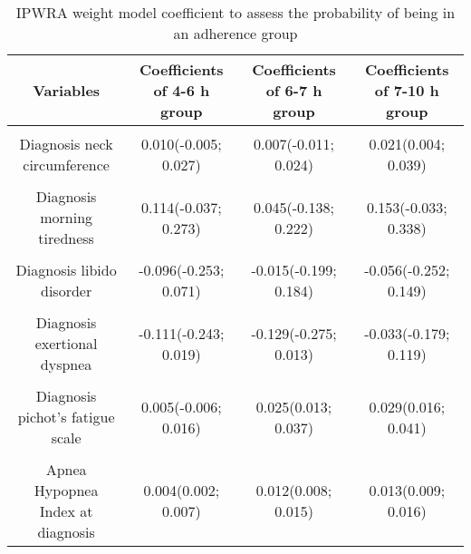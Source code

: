 \documentclass{article}
\begin{document}
\begin{table}[H]

\caption{\label{tab:Wheight_coefficients}IPWRA weight model coefficient to assess the probability of being in an adherence group}
\centering
\fontsize{7}{9}\selectfont
\begin{tabular}[t]{cccc}
\toprule
Variables & Coefficients of 4-6 h group & Coefficients of 6-7 h group & Coefficients of 7-10 h group\\
\midrule
\cellcolor{gray!6}{Diagnosis age (years)} & \cellcolor{gray!6}{0.013(0.008; 0.018)} & \cellcolor{gray!6}{0.022(0.016; 0.028)} & \cellcolor{gray!6}{0.030(0.024; 0.037)}\\
Diagnosis neck circumference & 0.010(-0.005; 0.027) & 0.007(-0.011; 0.024) & 0.021(0.004; 0.039)\\
\cellcolor{gray!6}{Diagnosis sleepiness at the wheel} & \cellcolor{gray!6}{0.205(0.084; 0.338)} & \cellcolor{gray!6}{0.197(0.047; 0.348)} & \cellcolor{gray!6}{0.060(-0.088; 0.213)}\\
Diagnosis morning tiredness & 0.114(-0.037; 0.273) & 0.045(-0.138; 0.222) & 0.153(-0.033; 0.338)\\
\cellcolor{gray!6}{Diagnosis morning headaches} & \cellcolor{gray!6}{0.012(-0.126; 0.153)} & \cellcolor{gray!6}{0.053(-0.112; 0.229)} & \cellcolor{gray!6}{0.005(-0.168; 0.162)}\\
Diagnosis libido disorder & -0.096(-0.253; 0.071) & -0.015(-0.199; 0.184) & -0.056(-0.252; 0.149)\\
\cellcolor{gray!6}{Diagnosis night sweating} & \cellcolor{gray!6}{-0.046(-0.191; 0.098)} & \cellcolor{gray!6}{-0.004(-0.173; 0.167)} & \cellcolor{gray!6}{-0.005(-0.176; 0.162)}\\
Diagnosis exertional dyspnea & -0.111(-0.243; 0.019) & -0.129(-0.275; 0.013) & -0.033(-0.179; 0.119)\\
\cellcolor{gray!6}{Diagnosis epworth sleepiness scale} & \cellcolor{gray!6}{0.001(-0.012; 0.013)} & \cellcolor{gray!6}{-0.010(-0.024; 0.005)} & \cellcolor{gray!6}{-0.009(-0.024; 0.006)}\\
Diagnosis pichot's fatigue scale & 0.005(-0.006; 0.016) & 0.025(0.013; 0.037) & 0.029(0.016; 0.041)\\
\cellcolor{gray!6}{Diagnosis depression scale} & \cellcolor{gray!6}{0.003(-0.016; 0.022)} & \cellcolor{gray!6}{0.006(-0.014; 0.028)} & \cellcolor{gray!6}{0.004(-0.019; 0.028)}\\
Apnea Hypopnea Index at diagnosis & 0.004(0.002; 0.007) & 0.012(0.008; 0.015) & 0.013(0.009; 0.016)\\

\end{tabular}
\end{table}
\end{document}
